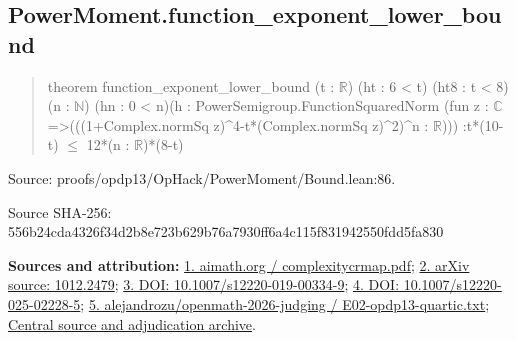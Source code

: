 \documentclass[11pt,a4paper]{article}
\begin{document}
\begin{samepage}
\subsection{PowerMoment.function\_exponent\_lower\_bound}
\begin{quote}\small\ttfamily theorem function\_exponent\_lower\_bound (t : \ensuremath{\mathbb{R}}) (ht : 6 < t) (ht8 : t < 8)\newline     (n : \ensuremath{\mathbb{N}}) (hn : 0 < n)\newline     (h : PowerSemigroup.FunctionSquaredNorm (fun z : \ensuremath{\mathbb{C}} =>\newline       (((1+Complex.normSq z)\textasciicircum{}4-t*(Complex.normSq z)\textasciicircum{}2)\textasciicircum{}n : \ensuremath{\mathbb{R}}))) :\newline     t*(10-t) \ensuremath{\leq} 12*(n : \ensuremath{\mathbb{R}})*(8-t)\end{quote}
{\small Source: proofs/opdp13/OpHack/PowerMoment/Bound.lean:86.\par}

{\small Source SHA-256: 556b24cda4326f34d2b8e723b629b76a7930ff6a4c115f831942550fdd5fa830\par}

{\small\textbf{Sources and attribution:} \href{https://aimath.org/WWN/complexitycrmap/complexitycrmap.pdf}{1. aimath.org / complexitycrmap.pdf}; \href{https://arxiv.org/abs/1012.2479}{2. arXiv source: 1012.2479}; \href{https://doi.org/10.1007/s12220-019-00334-9}{3. DOI: 10.1007/s12220-019-00334-9}; \href{https://doi.org/10.1007/s12220-025-02228-5}{4. DOI: 10.1007/s12220-025-02228-5}; \href{https://github.com/alejandrozu/openmath-2026-judging/blob/d0ed487f487fa7ec814ff705ab55249983fe8707/OpenMath-Judging/review/entries/E02-opdp13-quartic.txt}{5. alejandrozu/openmath-2026-judging / E02-opdp13-quartic.txt}; \href{https://github.com/alejandrozu/openmath-2026-judging}{Central source and adjudication archive}.\par}

\end{samepage}
\end{document}
